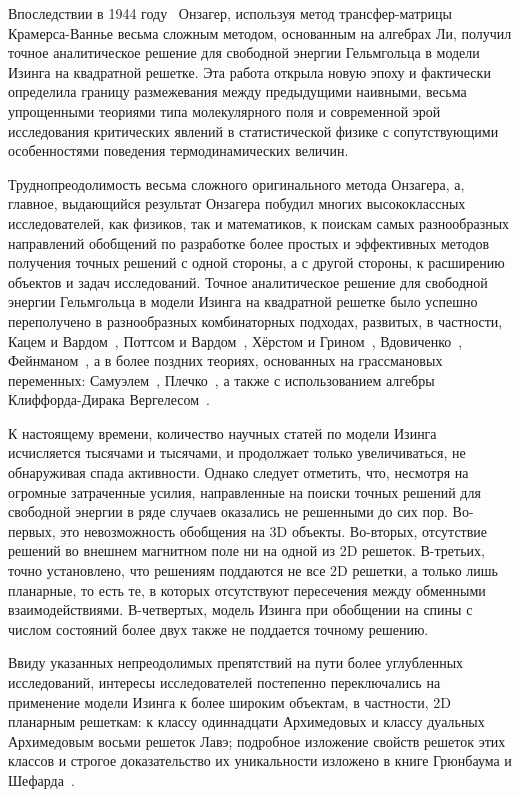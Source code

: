 \documentclass[utf8,12pt]{jetp}
\begin{document}
Впоследствии в 1944 году~\cite{onsager1941} Онзагер, используя метод трансфер-матрицы Крамерса-Ваннье весьма сложным методом, основанным на алгебрах Ли, получил точное аналитическое решение для свободной энергии Гельмгольца в модели Изинга на квадратной решетке. Эта работа открыла новую эпоху и фактически определила границу размежевания между предыдущими наивными, весьма упрощенными теориями типа молекулярного поля и современной эрой исследования критических явлений в статистической физике с сопутствующими особенностями поведения термодинамических величин. 

Труднопреодолимость весьма сложного оригинального метода Онзагера, а, главное, выдающийся результат Онзагера побудил многих высококлассных исследователей, как физиков, так и математиков, к поискам самых разнообразных направлений обобщений по разработке более простых и эффективных методов получения точных решений с одной стороны, а с другой стороны, к расширению объектов и задач исследований. Точное аналитическое решение для свободной энергии Гельмгольца в модели Изинга на квадратной решетке было успешно переполучено в разнообразных комбинаторных подходах, развитых, в частности, Кацем и Вардом~\cite{kac1952}, Поттсом и Вардом~\cite{potts1955}, Хёрстом и Грином~\cite{hurst1960}, Вдовиченко~\cite{vdovichenko1964, vdovichenko1965}, Фейнманом~\cite{feynman1972}, а в более поздних теориях, основанных на грассмановых переменных: Самуэлем~\cite{samuel1980}, Плечко~\cite{plechko1985}, а также с использованием алгебры Клиффорда-Дирака Вергелесом~\cite{vergeles2009}.

К настоящему времени, количество научных статей по модели Изинга исчисляется тысячами и тысячами, и продолжает только увеличиваться, не обнаруживая спада активности. Однако следует отметить, что, несмотря на огромные затраченные усилия, направленные на поиски точных решений для свободной энергии в ряде случаев оказались не решенными до сих пор. Во-первых, это невозможность обобщения на 3D объекты. Во-вторых, отсутствие решений во внешнем магнитном поле ни на одной из 2D решеток. В-третьих, точно установлено, что решениям поддаются не все 2D решетки, а только лишь планарные, то есть те, в которых отсутствуют пересечения между обменными взаимодействиями. В-четвертых, модель Изинга при обобщении на спины с числом состояний более двух также не поддается точному решению. 

Ввиду указанных непреодолимых препятствий на пути более углубленных исследований, интересы исследователей постепенно переключались на применение модели Изинга к более широким объектам, в частности, 2D планарным решеткам: к классу одиннадцати Архимедовых и классу дуальных Архимедовым восьми решеток Лавэ; подробное изложение свойств решеток этих классов и строгое доказательство их уникальности изложено в книге Грюнбаума и Шефарда~\cite{grunbaum1987}. 
\end{document}
